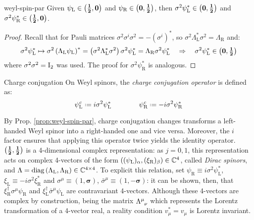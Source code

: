 \begin{proposition}{}{weyl-spin-par}
  Given $ \psi_\text{L} \in \mathbf{\left( \frac{1}{2},0 \right)} $ and $ \psi_\text{R} \in \mathbf{\left( 0,\frac{1}{2} \right)} $, then $ \sigma^2 \psi_\text{L}^* \in \mathbf{\left( 0,\frac{1}{2} \right)} $ and $ \sigma^2 \psi_\text{R}^* \in \mathbf{\left( \frac{1}{2},0 \right)} $.

  \tcblower

  \begin{proof}
    Recall that for Pauli matrices $ \sigma^2 \sigma^i \sigma^2 = -(\sigma^i)^* $, so $ \sigma^2 \Lambda_\text{L}^* \sigma^2 = \Lambda_\text{R} $ and:
    \begin{equation*}
      \sigma^2 \psi_\text{L}^* \mapsto \sigma^2 \left( \Lambda_\text{L} \psi_\text{L} \right)^* = \left( \sigma^2 \Lambda_\text{L}^* \sigma^2 \right) \sigma^2 \psi_\text{L}^* = \Lambda_\text{R} \sigma^2 \psi_\text{L}^*
      \quad \Rightarrow \quad
      \sigma^2 \psi_\text{L}^* \in \mathbf{\left( 0,\tfrac{1}{2} \right)}
    \end{equation*}
    where $ \sigma^2 \sigma^2 = \mathrm{I}_2 $ was used. The proof for $ \sigma^2 \psi_\text{R}^* $ is analogous.
  \end{proof}
\end{proposition}

\begin{definition}{Charge conjugation}{}
  On Weyl spinors, the \textit{charge conjugation operator} is defined as:
  \begin{equation}
    \psi_\text{L}^c \defeq i \sigma^2 \psi_\text{L}^*
    \qquad \qquad
    \psi_\text{R}^c \defeq -i \sigma^2 \psi_\text{R}^*
    \label{eq:1.42}
  \end{equation}
\end{definition}

By Prop. \ref{prop:weyl-spin-par}, charge conjugation changes transforms a left-handed Weyl spinor into a right-handed one and vice versa. Moreover, the $ i $ factor ensures that applying this operator twice yields the identity operator.\\
$ \mathbf{\left( \frac{1}{2},\frac{1}{2} \right)} $ is a 4-dimensional complex representation: as $ j = 0,1 $, this representation acts on complex 4-vectors of the form $ \left( (\psi_\text{L})_\alpha, (\xi_\text{R})_\beta \right) \in \mathbb{C}^4 $, called \textit{Dirac spinors}, and $ \Lambda = \operatorname{diag} \left( \Lambda_\text{L}, \Lambda_\text{R} \right) \in \mathbb{C}^{4 \times 4} $. To explicit this relation, set $ \psi_\text{R} \equiv i \sigma^2 \psi_\text{L}^* $, $ \xi_\text{L} \equiv -i \sigma^2 \xi_\text{R}^* $ and $ \sigma^\mu \equiv \left( 1, \boldsymbol{\sigma} \right) $, $ \bar\sigma^\mu \equiv \left( 1, -\boldsymbol{\sigma} \right) $: it can be shown, then, that $ \xi_\text{R}^\dagger \sigma^\mu \psi_\text{R} $ and $ \xi_\text{L}^\dagger \bar\sigma^\mu \psi_\text{L} $ are contravariant 4-vectors. Although these 4-vectors are complex by construction, being the matrix $ \tensor{\Lambda}{^\mu_\nu} $ which represents the Lorentz transformation of a 4-vector real, a reality condition $ v_\mu^* = v_\mu $ is Lorentz invariant.

